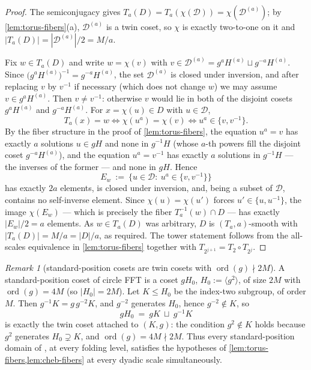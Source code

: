 \documentclass[11pt]{article}
\theoremstyle{definition}
\theoremstyle{remark}
\newtheorem{remark}[theorem]{Remark}
\begin{document}
\begin{proof}
The semiconjugacy gives $T_a(D)=T_a(\chi(\mathcal D))=\chi(\mathcal D^{(a)})$; by \cref{lem:torus-fibers}(a), $\mathcal D^{(a)}$ is a twin coset, so $\chi$ is exactly two-to-one on it and $|T_a(D)|=|\mathcal D^{(a)}|/2=M/a$.

Fix $w\in T_a(D)$ and write $w=\chi(v)$ with $v\in\mathcal D^{(a)}=g^aH^{(a)}\sqcup g^{-a}H^{(a)}$. Since $\bigl(g^aH^{(a)}\bigr)^{-1}=g^{-a}H^{(a)}$, the set $\mathcal D^{(a)}$ is closed under inversion, and after replacing $v$ by $v^{-1}$ if necessary (which does not change $w$) we may assume $v\in g^aH^{(a)}$. Then $v\ne v^{-1}$: otherwise $v$ would lie in both of the disjoint cosets $g^aH^{(a)}$ and $g^{-a}H^{(a)}$. For $x=\chi(u)\in D$ with $u\in\mathcal D$,
\[
T_a(x)=w
\iff
\chi(u^a)=\chi(v)
\iff
u^a\in\{v,v^{-1}\}.
\]
By the fiber structure in the proof of \cref{lem:torus-fibers}, the equation $u^a=v$ has exactly $a$ solutions $u\in gH$ and none in $g^{-1}H$ (whose $a$-th powers fill the disjoint coset $g^{-a}H^{(a)}$), and the equation $u^a=v^{-1}$ has exactly $a$ solutions in $g^{-1}H$ --- the inverses of the former --- and none in $gH$. Hence
\[
E_w\ :=\ \{u\in\mathcal D:\ u^a\in\{v,v^{-1}\}\}
\]
has exactly $2a$ elements, is closed under inversion, and, being a subset of $\mathcal D$, contains no self-inverse element. Since $\chi(u)=\chi(u')$ forces $u'\in\{u,u^{-1}\}$, the image $\chi(E_w)$ --- which is precisely the fiber $T_a^{-1}(w)\cap D$ --- has exactly $|E_w|/2=a$ elements. As $w\in T_a(D)$ was arbitrary, $D$ is $(T_a,a)$-smooth with $|T_a(D)|=M/a=|D|/a$, as required. The tower statement follows from the all-scales equivalence in \cref{lem:torus-fibers} together with $T_{2^{j+1}}=T_2\circ T_{2^j}$.
\end{proof}

\begin{remark}[standard-position cosets are twin cosets with $\operatorname{ord}(g)\nmid2M$]\label{rem:standard-position}
A standard-position coset of circle FFT \cite{HLP24} is a coset $gH_0$, $H_0:=\langle g^2\rangle$, of size $2M$ with $\operatorname{ord}(g)=4M$ (so $|H_0|=2M$). Let $K\le H_0$ be the index-two subgroup, of order $M$. Then $g^{-1}K=g\,g^{-2}K$, and $g^{-2}$ generates $H_0$, hence $g^{-2}\notin K$, so
\[
gH_0\ =\ gK\ \sqcup\ g^{-1}K
\]
is exactly the twin coset attached to $(K,g)$: the condition $g^2\notin K$ holds because $g^2$ generates $H_0\supsetneq K$, and $\operatorname{ord}(g)=4M\nmid2M$. Thus every standard-position domain of \cite{HLP24}, at every folding level, satisfies the hypotheses of \cref{lem:torus-fibers,lem:cheb-fibers} at every dyadic scale simultaneously.
\end{remark}
\end{document}
